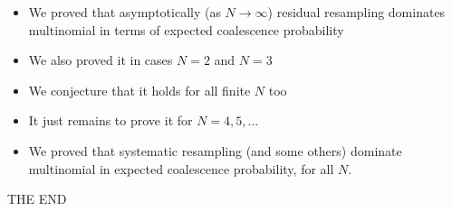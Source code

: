\documentclass[aspectratio=169]{beamer}
\theoremstyle{definition}
\begin{document}
\begin{frame}
\begin{itemize}
\item We proved that asymptotically (as $N\to\infty$) residual resampling dominates multinomial in terms of expected coalescence probability
\item We also proved it in cases $N=2$ and $N=3$
\pause
\item We conjecture that it holds for all finite $N$ too
\item It just remains to prove it for $N=4,5,\dots$
\pause
\item We proved that systematic resampling (and some others) dominate multinomial in expected coalescence probability, for all $N$.
\end{itemize}
\end{frame}


\begin{frame}
\centering
THE END
\end{frame}
\end{document}
